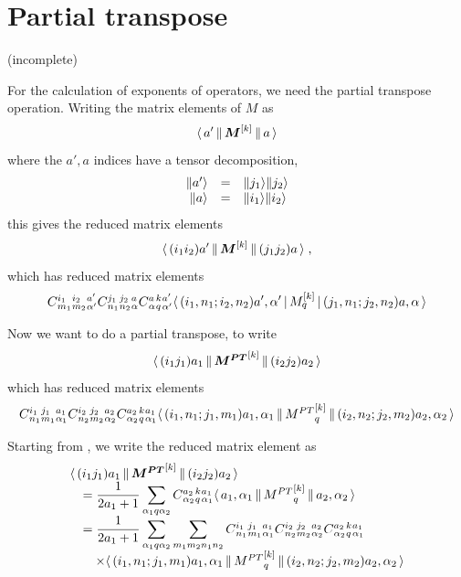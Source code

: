 \documentclass{article}[10pt]
\begin{document}
\section{Partial transpose}

(incomplete)

For the calculation of exponents of operators, we need the partial transpose operation. Writing
the matrix elements of $M$ as
\begin{equation}
\rbigbraket{a'}{\itensor{M}{k}}{a}
\end{equation}
where the $a',a$ indices have a tensor decomposition,
\begin{equation}
\begin{array}{rcl}
\rket{a'} &=& \rket{j_1} \rket{j_2} \\
\rket{a} &=& \rket{i_1} \rket{i_2}
\end{array}
\end{equation}
this gives the reduced matrix elements
\begin{equation}
\rbigbraket{(i_1 i_2) a'}{\itensor{M}{k}}{(j_1 j_2) a} \; ,
\end{equation}
which has reduced matrix elements
\begin{equation}
\qcg{i_1}{i_2}{a'}{m_1}{m_2}{\alpha'}
\qcg{j_1}{j_2}{a}{n_1}{n_2}{\alpha}
\qcg{a}{k}{a'}{\alpha}{q}{\alpha'}
\bigbraket{(i_1, n_1 ; i_2, n_2) a',\alpha'}{\itensorcomp{M}{k}{q}}{(j_1,n_1;j_2,n_2) a,\alpha}
\end{equation}

Now we want to do a partial transpose, to write
\begin{equation}
\rbigbraket{(i_1 j_1) a_1}{\itensor{M^{PT}}{k}}{(i_2 j_2) a_2}
\label{eq:TransposedRME}
\end{equation}
which has reduced matrix elements
\begin{equation}
\qcg{i_1}{j_1}{a_1}{n_1}{m_1}{\alpha_1}
\qcg{i_2}{j_2}{a_2}{n_2}{m_2}{\alpha_2}
\qcg{a_2}{k}{a_1}{\alpha_2}{q}{\alpha_1}
\rbigbraket{(i_1,n_1; j_1,m_1) a_1,\alpha_1}{\itensorcomp{M^{PT}}{k}{q}}{(i_2,n_2; j_2,m_2) a_2,\alpha_2}
\end{equation}

Starting from , we write the reduced matrix element as
\begin{equation}
\begin{array}{l}
\displaystyle
\rbigbraket{(i_1 j_1) a_1}{\itensor{M^{PT}}{k}}{(i_2 j_2) a_2} \\ \quad \displaystyle
= \frac{1}{2a_1+1} \sum_{\alpha_1 q \alpha_2} \qcg{a_2}{k}{a_1}{\alpha_2}{q}{\alpha_1}
\rbigbraket{a_1,\alpha_1}{\itensorcomp{M^{PT}}{k}{q}}{a_2,\alpha_2} \\ \quad \displaystyle
= \frac{1}{2a_1+1} \sum_{\alpha_1 q \alpha_2} \sum_{m_1 m_2 n_1 n_2}
\qcg{i_1}{j_1}{a_1}{n_1}{m_1}{\alpha_1}
\qcg{i_2}{j_2}{a_2}{n_2}{m_2}{\alpha_2}
\qcg{a_2}{k}{a_1}{\alpha_2}{q}{\alpha_1}
\\ \quad \quad \displaystyle \times
\rbigbraket{(i_1,n_1; j_1,m_1) a_1,\alpha_1}{\itensorcomp{M^{PT}}{k}{q}}{(i_2,n_2; j_2,m_2) a_2,\alpha_2}
\\
\end{array}
\end{equation}
\end{document}

